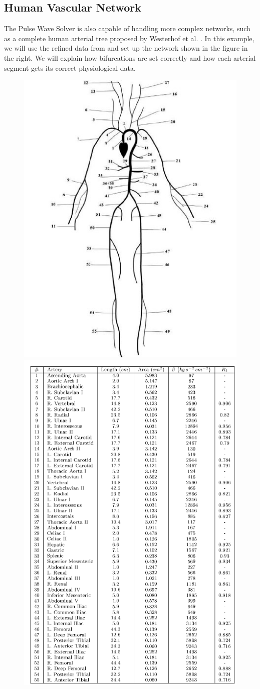 \subsection{Human Vascular Network}
The Pulse Wave Solver is also capable of handling more complex networks, such as
a complete human arterial tree proposed by Westerhof et al. \cite{We69}.
In this example, we will use the refined data from \cite{ShFoPeFr03} and set up
the network shown in the figure in the right. We will explain how bifurcations
are set correctly and how each arterial segment gets its correct physiological
data.

\begin{figure}
	\includegraphics[width=0.49\linewidth]{img/55_artery_network.jpg}
	\includegraphics[width=0.49\linewidth]{img/Data_Table.png}
\end{figure}

